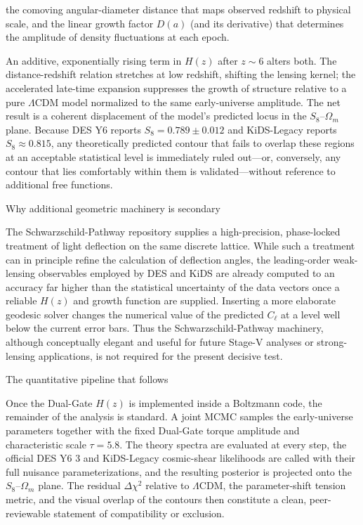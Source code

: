 the comoving angular-diameter distance that maps observed redshift to physical scale, and  
the linear growth factor \(D(a)\) (and its derivative) that determines the amplitude of density fluctuations at each epoch.

An additive, exponentially rising term in \(H(z)\) after \(z\sim6\) alters both. The distance-redshift relation stretches at low redshift, shifting the lensing kernel; the accelerated late-time expansion suppresses the growth of structure relative to a pure \(\Lambda\)CDM model normalized to the same early-universe amplitude. The net result is a coherent displacement of the model’s predicted locus in the \(S_8\)–\(\Omega_m\) plane. Because DES Y6 reports \(S_8=0.789\pm0.012\) and KiDS-Legacy reports \(S_8\approx0.815\), any theoretically predicted contour that fails to overlap these regions at an acceptable statistical level is immediately ruled out—or, conversely, any contour that lies comfortably within them is validated—without reference to additional free functions.

Why additional geometric machinery is secondary

The Schwarzschild-Pathway repository supplies a high-precision, phase-locked treatment of light deflection on the same discrete lattice. While such a treatment can in principle refine the calculation of deflection angles, the leading-order weak-lensing observables employed by DES and KiDS are already computed to an accuracy far higher than the statistical uncertainty of the data vectors once a reliable \(H(z)\) and growth function are supplied. Inserting a more elaborate geodesic solver changes the numerical value of the predicted \(C_\ell\) at a level well below the current error bars. Thus the Schwarzschild-Pathway machinery, although conceptually elegant and useful for future Stage-V analyses or strong-lensing applications, is not required for the present decisive test.

The quantitative pipeline that follows

Once the Dual-Gate \(H(z)\) is implemented inside a Boltzmann code, the remainder of the analysis is standard. A joint MCMC samples the early-universe parameters together with the fixed Dual-Gate torque amplitude and characteristic scale \(\tau=5.8\). The theory spectra are evaluated at every step, the official DES Y6 3 and KiDS-Legacy cosmic-shear likelihoods are called with their full nuisance parameterizations, and the resulting posterior is projected onto the \(S_8\)–\(\Omega_m\) plane. The residual \(\Delta\chi^2\) relative to \(\Lambda\)CDM, the parameter-shift tension metric, and the visual overlap of the contours then constitute a clean, peer-reviewable statement of compatibility or exclusion.

